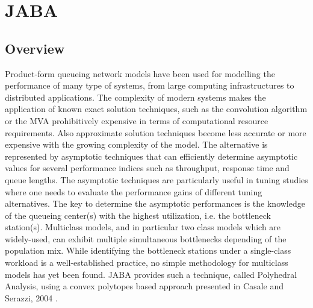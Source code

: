 %
%
%
%
%
\chapter{JABA}
\label{cha:jaba}
\section{Overview}
Product-form queueing network models have been used for modelling the performance of many type of systems, from large computing infrastructures to distributed applications. The complexity of modern systems makes the application of known exact solution techniques, such as the convolution algorithm or the MVA prohibitively expensive in terms of computational resource requirements. Also approximate solution techniques become less accurate or more expensive with the growing complexity of the model. The alternative is represented by asymptotic techniques that can efficiently determine asymptotic values for several performance indices such as throughput, response time and queue lengths.
The asymptotic techniques are particularly useful in tuning studies where one needs to evaluate the performance gains of different tuning alternatives. The key to determine the asymptotic performances is the knowledge of the queueing center(s) with the highest utilization, i.e. the bottleneck station(s). Multiclass models, and in particular two class models which are widely-used, can exhibit multiple simultaneous bottlenecks depending of the population mix.
While identifying the bottleneck stations under a single-class workload is a well-established practice, no simple
methodology for multiclass models has yet been found. JABA provides such a technique, called Polyhedral Analysis, using a convex polytopes  based approach presented in Casale and Serazzi, 2004 \cite{polytopes}.

